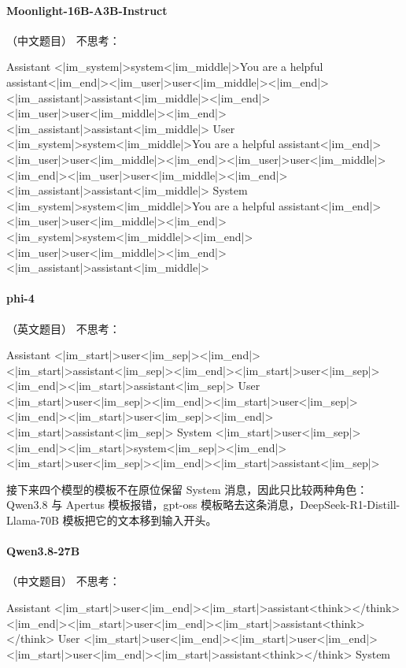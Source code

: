 \paragraph{Moonlight-16B-A3B-Instruct} （中文题目）
\noindent 不思考：
\begin{Rendering}
Assistant  <|im_system|>system<|im_middle|>You are a helpful assistant<|im_end|><|im_user|>user<|im_middle|><|im_end|><|im_assistant|>assistant<|im_middle|><|im_end|><|im_user|>user<|im_middle|><|im_end|><|im_assistant|>assistant<|im_middle|>
User       <|im_system|>system<|im_middle|>You are a helpful assistant<|im_end|><|im_user|>user<|im_middle|><|im_end|><|im_user|>user<|im_middle|><|im_end|><|im_user|>user<|im_middle|><|im_end|><|im_assistant|>assistant<|im_middle|>
System     <|im_system|>system<|im_middle|>You are a helpful assistant<|im_end|><|im_user|>user<|im_middle|><|im_end|><|im_system|>system<|im_middle|><|im_end|><|im_user|>user<|im_middle|><|im_end|><|im_assistant|>assistant<|im_middle|>
\end{Rendering}
\paragraph{phi-4} （英文题目）
\noindent 不思考：
\begin{Rendering}
Assistant  <|im_start|>user<|im_sep|><|im_end|><|im_start|>assistant<|im_sep|><|im_end|><|im_start|>user<|im_sep|><|im_end|><|im_start|>assistant<|im_sep|>
User       <|im_start|>user<|im_sep|><|im_end|><|im_start|>user<|im_sep|><|im_end|><|im_start|>user<|im_sep|><|im_end|><|im_start|>assistant<|im_sep|>
System     <|im_start|>user<|im_sep|><|im_end|><|im_start|>system<|im_sep|><|im_end|><|im_start|>user<|im_sep|><|im_end|><|im_start|>assistant<|im_sep|>
\end{Rendering}

接下来四个模型的模板不在原位保留 System 消息，因此只比较两种角色：Qwen3.8 与 Apertus 模板报错，gpt-oss 模板略去这条消息，DeepSeek-R1-Distill-Llama-70B 模板把它的文本移到输入开头。

\paragraph{Qwen3.8-27B} （中文题目）
\noindent 不思考：
\begin{Rendering}
Assistant  <|im_start|>user\NL{}<|im_end|>\NL{}<|im_start|>assistant\NL{}<think>\NL{}\NL{}</think>\NL{}\NL{}<|im_end|>\NL{}<|im_start|>user\NL{}<|im_end|>\NL{}<|im_start|>assistant\NL{}<think>\NL{}\NL{}</think>\NL{}\NL{}
User       <|im_start|>user\NL{}<|im_end|>\NL{}<|im_start|>user\NL{}<|im_end|>\NL{}<|im_start|>user\NL{}<|im_end|>\NL{}<|im_start|>assistant\NL{}<think>\NL{}\NL{}</think>\NL{}\NL{}
System     
\end{Rendering}
